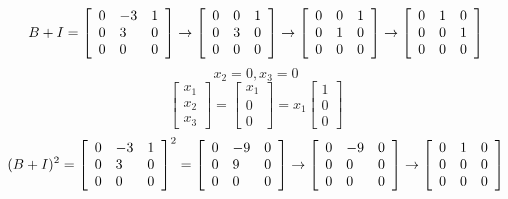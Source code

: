 \documentclass[12pt,letterpaper,reqno]{amsart}
\begin{document}
\begin{enumerate}
\begin{enumerate}
    \newline
    $$B+I = \left[ \begin{array} { l l l } { 0 } & { -3 } & { 1 } \\ { 0 } & { 3 } & { 0 } \\ { 0 } & { 0 } & { 0 } \end{array} \right] \rightarrow \left[ \begin{array} { l l l } { 0 } & { 0 } & { 1 } \\ { 0 } & { 3 } & { 0 } \\ { 0 } & { 0 } & { 0 } \end{array} \right] \rightarrow \left[ \begin{array} { l l l } { 0 } & { 0 } & { 1 } \\ { 0 } & { 1 } & { 0 } \\ { 0 } & { 0 } & { 0 } \end{array} \right] \rightarrow \left[ \begin{array} { l l l } { 0 } & { 1 } & { 0 } \\ { 0 } & { 0 } & { 1 } \\ { 0 } & { 0 } & { 0 } \end{array} \right]$$
    $$x_2 = 0, x_3 = 0$$
    $$\left[ \begin{array} { l } { x_1 } \\ { x_2 } \\ { x_3 } \end{array} \right] = \left[ \begin{array} { l } { x_1 } \\ { 0 } \\ { 0 } \end{array} \right] = x_1 \left[ \begin{array} { l } { 1 } \\ { 0 } \\ { 0 } \end{array} \right]$$
    \newline
    $$(B+I)^2 = \left[ \begin{array} { l l l } { 0 } & { -3 } & { 1 } \\ { 0 } & { 3 } & { 0 } \\ { 0 } & { 0 } & { 0 } \end{array} \right]^2 = \left[ \begin{array} { l l l } { 0 } & { -9 } & { 0 } \\ { 0 } & { 9 } & { 0 } \\ { 0 } & { 0 } & { 0 } \end{array} \right] \rightarrow \left[ \begin{array} { l l l } { 0 } & { -9 } & { 0 } \\ { 0 } & { 0 } & { 0 } \\ { 0 } & { 0 } & { 0 } \end{array} \right] \rightarrow \left[ \begin{array} { l l l } { 0 } & { 1 } & { 0 } \\ { 0 } & { 0 } & { 0 } \\ { 0 } & { 0 } & { 0 } \end{array} \right]$$

\end{enumerate}
\end{enumerate}
\end{document}
